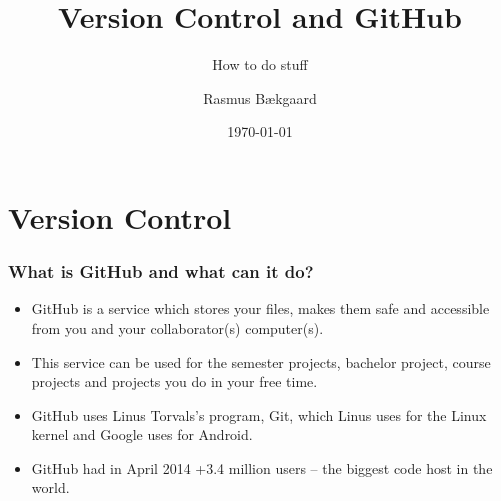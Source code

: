\documentclass{beamer}
\title{Version Control and GitHub}
\subtitle{How to do stuff}
\author{Rasmus Bækgaard}
\institute{Aarhus University}
\date{\today}
\begin{document}
\frame{
	\titlepage
	
} 




\section{Version Control}
\frame
{
	\frametitle{What is GitHub and what can it do?}
	
\begin{itemize}
\item GitHub is a service which stores your files, makes them safe and 
accessible from you and your collaborator(s) computer(s).

\item This service can be used for the semester projects, bachelor project, 
course projects and projects you do in your free time.

\item GitHub uses Linus Torvals's program, Git, which Linus uses for the Linux 
kernel and Google uses for Android.

\item GitHub had in April 2014 +3.4 million users -- the biggest code host in 
the world.
\end{itemize}

}


\end{document}

